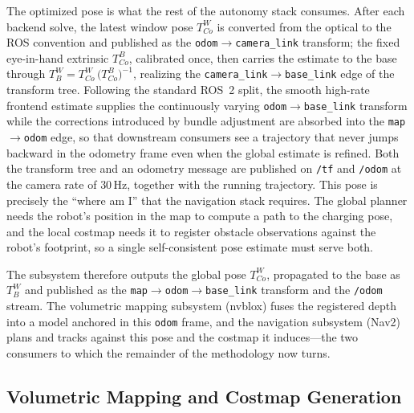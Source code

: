 The optimized pose is what the rest of the autonomy stack consumes. After each backend solve, the latest window pose $T^{W}_{Co}$ is converted from the optical to the ROS convention and published as the \texttt{odom}$\to$\texttt{camera\_link} transform; the fixed eye-in-hand extrinsic $T^{B}_{Co}$, calibrated once, then carries the estimate to the base through $T^{W}_{B}=T^{W}_{Co}\,\big(T^{B}_{Co}\big)^{-1}$, realizing the \texttt{camera\_link}$\to$\texttt{base\_link} edge of the transform tree. Following the standard ROS~2 split, the smooth high-rate frontend estimate supplies the continuously varying \texttt{odom}$\to$\texttt{base\_link} transform while the corrections introduced by bundle adjustment are absorbed into the \texttt{map}$\to$\texttt{odom} edge, so that downstream consumers see a trajectory that never jumps backward in the odometry frame even when the global estimate is refined. Both the transform tree and an odometry message are published on \texttt{/tf} and \texttt{/odom} at the camera rate of \ensuremath{30\,\mathrm{Hz}}, together with the running trajectory. This pose is precisely the ``where am I'' that the navigation stack requires. The global planner needs the robot's position in the map to compute a path to the charging pose, and the local costmap needs it to register obstacle observations against the robot's footprint, so a single self-consistent pose estimate must serve both.

The subsystem therefore outputs the global pose $T^{W}_{Co}$, propagated to the base as $T^{W}_{B}$ and published as the \texttt{map}$\to$\texttt{odom}$\to$\texttt{base\_link} transform and the \texttt{/odom} stream. The volumetric mapping subsystem (nvblox) fuses the registered depth into a model anchored in this \texttt{odom} frame, and the navigation subsystem (Nav2) plans and tracks against this pose and the costmap it induces---the two consumers to which the remainder of the methodology now turns.


\subsection{Volumetric Mapping and Costmap Generation}\label{meth:sec:nvblox}

